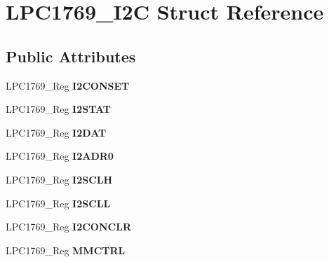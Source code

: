 \hypertarget{struct_l_p_c1769___i2_c}{\section{L\+P\+C1769\+\_\+\+I2\+C Struct Reference}
\label{struct_l_p_c1769___i2_c}
}
\subsection*{Public Attributes}
\begin{DoxyCompactItemize}
\item 
\hypertarget{struct_l_p_c1769___i2_c_a30b12ce63510c24d1877cabaf1df978a}{L\+P\+C1769\+\_\+\+Reg {\bfseries I2\+C\+O\+N\+S\+E\+T}}\label{struct_l_p_c1769___i2_c_a30b12ce63510c24d1877cabaf1df978a}

\item 
\hypertarget{struct_l_p_c1769___i2_c_ab661090031244375bcfad95c6e01019a}{L\+P\+C1769\+\_\+\+Reg {\bfseries I2\+S\+T\+A\+T}}\label{struct_l_p_c1769___i2_c_ab661090031244375bcfad95c6e01019a}

\item 
\hypertarget{struct_l_p_c1769___i2_c_a6d30ed13074d2951c7881a37658c44ec}{L\+P\+C1769\+\_\+\+Reg {\bfseries I2\+D\+A\+T}}\label{struct_l_p_c1769___i2_c_a6d30ed13074d2951c7881a37658c44ec}

\item 
\hypertarget{struct_l_p_c1769___i2_c_ac6ccf3f6ebbd684be937852507d1180c}{L\+P\+C1769\+\_\+\+Reg {\bfseries I2\+A\+D\+R0}}\label{struct_l_p_c1769___i2_c_ac6ccf3f6ebbd684be937852507d1180c}

\item 
\hypertarget{struct_l_p_c1769___i2_c_aeefe9eb3aeb92df6ebbc307efd77459a}{L\+P\+C1769\+\_\+\+Reg {\bfseries I2\+S\+C\+L\+H}}\label{struct_l_p_c1769___i2_c_aeefe9eb3aeb92df6ebbc307efd77459a}

\item 
\hypertarget{struct_l_p_c1769___i2_c_a64819c8d1742066b38ddec5dfab24bbc}{L\+P\+C1769\+\_\+\+Reg {\bfseries I2\+S\+C\+L\+L}}\label{struct_l_p_c1769___i2_c_a64819c8d1742066b38ddec5dfab24bbc}

\item 
\hypertarget{struct_l_p_c1769___i2_c_a525a50c442bf7cf0d7bfe0877f12da98}{L\+P\+C1769\+\_\+\+Reg {\bfseries I2\+C\+O\+N\+C\+L\+R}}\label{struct_l_p_c1769___i2_c_a525a50c442bf7cf0d7bfe0877f12da98}

\item 
\hypertarget{struct_l_p_c1769___i2_c_a2fac4c30ef00e973af59ed4fffcd353f}{L\+P\+C1769\+\_\+\+Reg {\bfseries M\+M\+C\+T\+R\+L}}\label{struct_l_p_c1769___i2_c_a2fac4c30ef00e973af59ed4fffcd353f}


\end{DoxyCompactItemize}
